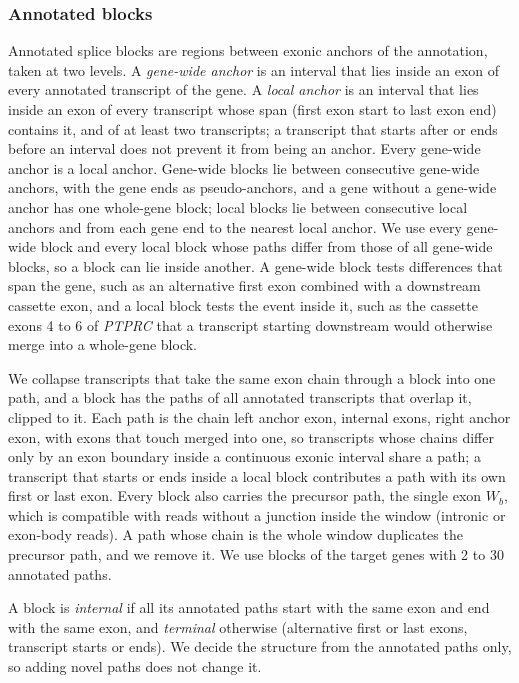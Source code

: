 \documentclass[11pt]{article}
\begin{document}
\subsubsection{Annotated blocks}
\label{sec:blocks}

Annotated splice blocks are regions between exonic anchors of the annotation, taken at two levels. A \emph{gene-wide anchor} is an interval that lies inside an exon of every annotated transcript of the gene. A \emph{local anchor} is an interval that lies inside an exon of every transcript whose span (first exon start to last exon end) contains it, and of at least two transcripts; a transcript that starts after or ends before an interval does not prevent it from being an anchor. Every gene-wide anchor is a local anchor. Gene-wide blocks lie between consecutive gene-wide anchors, with the gene ends as pseudo-anchors, and a gene without a gene-wide anchor has one whole-gene block; local blocks lie between consecutive local anchors and from each gene end to the nearest local anchor. We use every gene-wide block and every local block whose paths differ from those of all gene-wide blocks, so a block can lie inside another. A gene-wide block tests differences that span the gene, such as an alternative first exon combined with a downstream cassette exon, and a local block tests the event inside it, such as the cassette exons 4 to 6 of \emph{PTPRC} that a transcript starting downstream would otherwise merge into a whole-gene block.

We collapse transcripts that take the same exon chain through a block into one path, and a block has the paths of all annotated transcripts that overlap it, clipped to it. Each path is the chain left anchor exon, internal exons, right anchor exon, with exons that touch merged into one, so transcripts whose chains differ only by an exon boundary inside a continuous exonic interval share a path; a transcript that starts or ends inside a local block contributes a path with its own first or last exon. Every block also carries the precursor path, the single exon $W_b$, which is compatible with reads without a junction inside the window (intronic or exon-body reads). A path whose chain is the whole window duplicates the precursor path, and we remove it. We use blocks of the target genes with 2 to 30 annotated paths.

A block is \emph{internal} if all its annotated paths start with the same exon and end with the same exon, and \emph{terminal} otherwise (alternative first or last exons, transcript starts or ends). We decide the structure from the annotated paths only, so adding novel paths does not change it.
\end{document}
